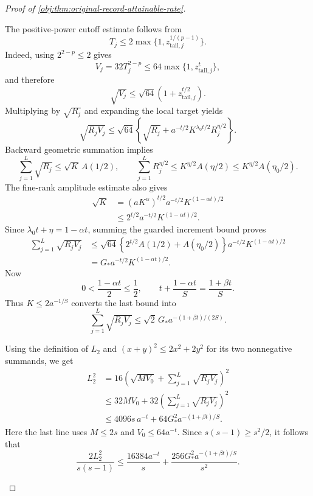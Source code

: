 \documentclass[11pt]{article}
\begin{document}
\begin{proof}[Proof of \cref{obj:thm:original-record-attainable-rate}]
\begin{enumerate}
The positive-power cutoff estimate follows from
\[
T_j\le2\max\{1,z_{\mathrm{tail},j}^{1/(p-1)}\}.
\]
Indeed, using \(2^{2-p}\le2\) gives
\[
V_j=32T_j^{2-p}
\le64\max\{1,z_{\mathrm{tail},j}^{t}\},
\]
and therefore
\[
\sqrt{V_j}
\le\sqrt{64}\left(1+z_{\mathrm{tail},j}^{t/2}\right).
\]
Multiplying by \(\sqrt{R_j}\) and expanding the local target yields
\[
\sqrt{R_jV_j}
\le\sqrt{64}
\left\{
\sqrt{R_j}
+a^{-t/2}K^{\lambda_0t/2}R_j^{\eta/2}
\right\}.
\]
Backward geometric summation implies
\[
\sum_{j=1}^{L}\sqrt{R_j}
\le\sqrt K\,A(1/2),
\qquad
\sum_{j=1}^{L}R_j^{\eta/2}
\le K^{\eta/2}A(\eta/2)
\le K^{\eta/2}A(\eta_0/2).
\]
The fine-rank amplitude estimate also gives
\[
\begin{aligned}
\sqrt K
&=(aK^\alpha)^{t/2}
  a^{-t/2}K^{(1-\alpha t)/2}\\
&\le2^{t/2}a^{-t/2}K^{(1-\alpha t)/2}.
\end{aligned}
\]
Since \(\lambda_0t+\eta=1-\alpha t\), summing the guarded increment bound proves
\[
\begin{aligned}
\sum_{j=1}^{L}\sqrt{R_jV_j}
&\le\sqrt{64}
 \left\{2^{t/2}A(1/2)+A(\eta_0/2)\right\}
 a^{-t/2}K^{(1-\alpha t)/2}\\
&=G_*a^{-t/2}K^{(1-\alpha t)/2}.
\end{aligned}
\]
Now
\[
0<\frac{1-\alpha t}{2}\le\frac12,
\qquad
t+\frac{1-\alpha t}{S}=\frac{1+\beta t}{S}.
\]
Thus \(K\le2a^{-1/S}\) converts the last bound into
\[
\sum_{j=1}^{L}\sqrt{R_jV_j}
\le\sqrt2\,G_*a^{-(1+\beta t)/(2S)}.
\]

Using the definition of \(L_2\) and \((x+y)^2\le2x^2+2y^2\) for its two nonnegative summands, we get
\[
\begin{aligned}
L_2^2
&=16\left(
\sqrt{MV_0}+\sum_{j=1}^{L}\sqrt{R_jV_j}
\right)^2\\
&\le32MV_0
 +32\left(\sum_{j=1}^{L}\sqrt{R_jV_j}\right)^2\\
&\le4096s\,a^{-t}
 +64G_*^2a^{-(1+\beta t)/S}.
\end{aligned}
\]
Here the last line uses \(M\le2s\) and \(V_0\le64a^{-t}\).
Since \(s(s-1)\ge s^2/2\), it follows that
\[
\frac{2L_2^2}{s(s-1)}
\le\frac{16384a^{-t}}{s}
 +\frac{256G_*^2a^{-(1+\beta t)/S}}{s^2}.
\]


\end{enumerate}
\end{proof}
\end{document}
